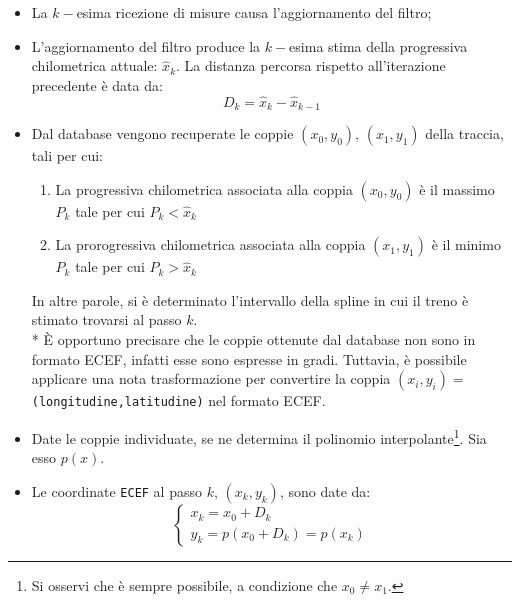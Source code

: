 \begin{itemize}
	\item La $k-$esima ricezione di misure causa l'aggiornamento del filtro;
	\item L'aggiornamento del filtro produce la $k-$esima stima della progressiva chilometrica attuale: $\hat{x}_k$. La distanza percorsa rispetto all'iterazione precedente \`e data da:
	$$
	D_k = \hat{x}_{k} - \hat{x}_{k-1}
	$$
	\item Dal database vengono recuperate le coppie $(x_0,y_0)$, $(x_1,y_1)$ della traccia, tali per cui:
	\begin{enumerate}
		\item La progressiva chilometrica associata alla coppia $(x_0,y_0)$ \`e il massimo $P_{k}$ tale per cui $P_{k} < \hat{x}_k$
		\item La prorogressiva chilometrica associata alla coppia $(x_1,y_1)$ \`e il minimo $P_{k}$ tale per cui $P_k > \hat{x}_k$
	\end{enumerate}
In altre parole, si \`e determinato l'intervallo della spline in cui il treno \`e stimato trovarsi al passo $k$.\\*
\`E opportuno precisare che 
	le coppie ottenute dal database non sono in formato ECEF, infatti esse sono espresse in gradi. Tuttavia, \`e possibile applicare una nota trasformazione per convertire la coppia $(x_i,y_i) = $ \texttt{(longitudine,latitudine)} nel formato ECEF.
	
	\item Date le coppie individuate, se ne determina il polinomio interpolante\footnote{Si osservi che \`e sempre possibile, a condizione che $x_0 \neq x_1$.}. Sia esso $p(x)$.
	\item Le coordinate \texttt{ECEF} al passo $k$, $(x_k,y_k)$, sono date da:
	$$
	\begin{cases}
	x_k = x_0 + D_k \\
	y_k = p(x_0 + D_k) = p(x_k)
	\end{cases}
	$$
\end{itemize}
